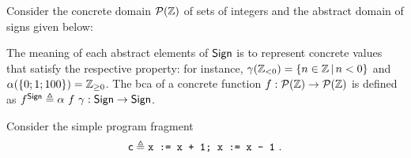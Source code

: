 \begin{example}\label{ex:lcla:ext-vs-int}
	Consider the concrete domain $\mathcal{P}(\mathbb{Z})$ of sets of integers and the abstract domain of signs given below:
	\begin{center}
%			
%			
	\end{center}
	The meaning of each abstract elements of $\mathsf{Sign}$ is to represent concrete values that satisfy the respective property: for instance, $\gamma(\mathbb{Z}_{< 0}) = \{ n \in \mathbb{Z} \,\vert\, n < 0 \}$ and $\alpha( \{ 0; 1; 100 \}) = \mathbb{Z}_{\ge 0}$.
	The bca of a concrete function $f: \mathcal{P}(\mathbb{Z}) \to \mathcal{P}(\mathbb{Z})$ is defined as $f^{\mathsf{Sign}}\triangleq \alpha~f~\gamma: \mathsf{Sign} \to \mathsf{Sign}$.
	
	Consider the simple program fragment 
	$$\regc \eqdef \code{x := x + 1; x := x - 1}\ .$$
	

\end{example}
